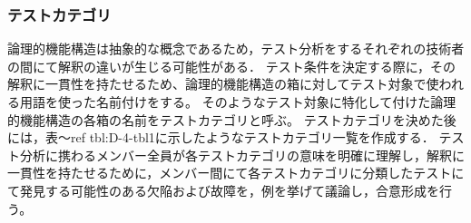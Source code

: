 \documentclass[a4paper,12pt]{jreport}
\begin{document}
\subsubsection{テストカテゴリ}
論理的機能構造は抽象的な概念であるため，テスト分析をするそれぞれの技術者の間にて解釈の違いが生じる可能性がある． テスト条件を決定する際に，その解釈に一貫性を持たせるため、論理的機能構造の箱に対してテスト対象で使われる用語を使った名前付けをする。 そのようなテスト対象に特化して付けた論理的機能構造の各箱の名前をテストカテゴリと呼ぶ。 テストカテゴリを決めた後には，表〜ref {tbl:D-4-tbl1}に示したようなテストカテゴリ一覧を作成する． テスト分析に携わるメンバー全員が各テストカテゴリの意味を明確に理解し，解釈に一貫性を持たせるために，メンバー間にて各テストカテゴリに分類したテストにて発見する可能性のある欠陥および故障を，例を挙げて議論し，合意形成を行う。
\end{document}
